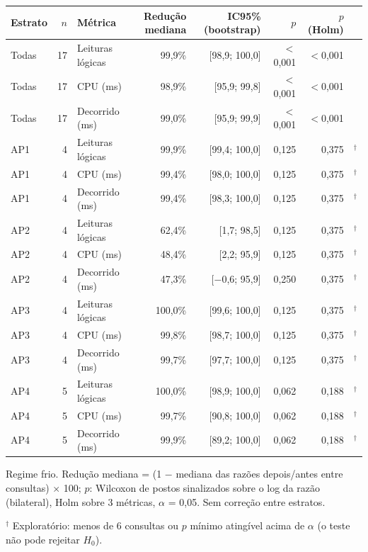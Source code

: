 {\small\setlength{\tabcolsep}{4pt}
\begin{tabular}{lrlrrrrl}
\toprule
Estrato & $n$ & Métrica & Redução mediana & IC95\% (bootstrap) & $p$ & $p$ (Holm) &  \\
\midrule
Todas & 17 & Leituras lógicas & 99,9\% & [98,9; 100,0] & $<$0,001 & $<$0,001 &  \\
Todas & 17 & CPU (ms) & 98,9\% & [95,9; 99,8] & $<$0,001 & $<$0,001 &  \\
Todas & 17 & Decorrido (ms) & 99,0\% & [95,9; 99,9] & $<$0,001 & $<$0,001 &  \\
\midrule
AP1 & 4 & Leituras lógicas & 99,9\% & [99,4; 100,0] & 0,125 & 0,375 & $^{\dagger}$ \\
AP1 & 4 & CPU (ms) & 99,4\% & [98,0; 100,0] & 0,125 & 0,375 & $^{\dagger}$ \\
AP1 & 4 & Decorrido (ms) & 99,4\% & [98,3; 100,0] & 0,125 & 0,375 & $^{\dagger}$ \\
\midrule
AP2 & 4 & Leituras lógicas & 62,4\% & [1,7; 98,5] & 0,125 & 0,375 & $^{\dagger}$ \\
AP2 & 4 & CPU (ms) & 48,4\% & [2,2; 95,9] & 0,125 & 0,375 & $^{\dagger}$ \\
AP2 & 4 & Decorrido (ms) & 47,3\% & [$-$0,6; 95,9] & 0,250 & 0,375 & $^{\dagger}$ \\
\midrule
AP3 & 4 & Leituras lógicas & 100,0\% & [99,6; 100,0] & 0,125 & 0,375 & $^{\dagger}$ \\
AP3 & 4 & CPU (ms) & 99,8\% & [98,7; 100,0] & 0,125 & 0,375 & $^{\dagger}$ \\
AP3 & 4 & Decorrido (ms) & 99,7\% & [97,7; 100,0] & 0,125 & 0,375 & $^{\dagger}$ \\
\midrule
AP4 & 5 & Leituras lógicas & 100,0\% & [98,9; 100,0] & 0,062 & 0,188 & $^{\dagger}$ \\
AP4 & 5 & CPU (ms) & 99,7\% & [90,8; 100,0] & 0,062 & 0,188 & $^{\dagger}$ \\
AP4 & 5 & Decorrido (ms) & 99,9\% & [89,2; 100,0] & 0,062 & 0,188 & $^{\dagger}$ \\
\bottomrule
\end{tabular}\par
\vspace{3pt}
\begin{minipage}{\linewidth}\footnotesize
Regime frio. Redução mediana = (1 $-$ mediana das razões depois/antes entre consultas) $\times$ 100; $p$: Wilcoxon de postos sinalizados sobre o log da razão (bilateral), Holm sobre 3 métricas, $\alpha$ = 0,05. Sem correção entre estratos.\par
$^{\dagger}$ Exploratório: menos de 6 consultas ou $p$ mínimo atingível acima de $\alpha$ (o teste não pode rejeitar $H_0$).
\end{minipage}
}
